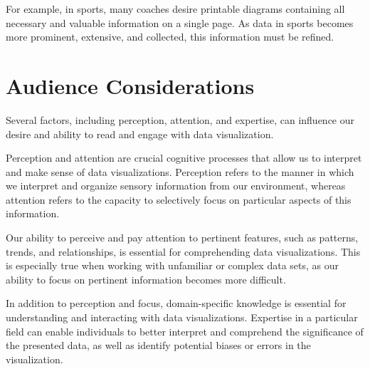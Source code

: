 \documentclass[print]{nuthesis}
\begin{document}

For example, in sports, many coaches desire printable diagrams containing all necessary and valuable information on a single page.
As data in sports becomes more prominent, extensive, and collected, this information must be refined.


\hypertarget{audience-considerations}{%
\section{Audience Considerations}\label{audience-considerations}}

Several factors, including perception, attention, and expertise, can influence our desire and ability to read and engage with data visualization.

Perception and attention are crucial cognitive processes that allow us to interpret and make sense of data visualizations.
Perception refers to the manner in which we interpret and organize sensory information from our environment, whereas attention refers to the capacity to selectively focus on particular aspects of this information.

Our ability to perceive and pay attention to pertinent features, such as patterns, trends, and relationships, is essential for comprehending data visualizations.
This is especially true when working with unfamiliar or complex data sets, as our ability to focus on pertinent information becomes more difficult.

In addition to perception and focus, domain-specific knowledge is essential for understanding and interacting with data visualizations.
Expertise in a particular field can enable individuals to better interpret and comprehend the significance of the presented data, as well as identify potential biases or errors in the visualization.
\end{document}
